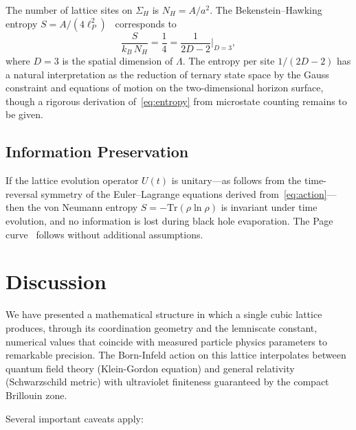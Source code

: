 \documentclass[12pt,a4paper]{article}
\begin{document}
The number of lattice sites on $\Sigma_{H}$ is $N_{H} = A/a^{2}$. The Bekenstein--Hawking entropy $S = A/(4\ell_{P}^{2})$~\cite{Bekenstein} corresponds to
\begin{equation}\label{eq:entropy}
\frac{S}{k_{B}\,N_{H}} = \frac{1}{4} = \frac{1}{2D - 2}\bigg|_{D=3},
\end{equation}
where $D = 3$ is the spatial dimension of $\Lambda$. The entropy per site $1/(2D-2)$ has a natural interpretation as the reduction of ternary state space by the Gauss constraint and equations of motion on the two-dimensional horizon surface, though a rigorous derivation of~\eqref{eq:entropy} from microstate counting remains to be given.

\subsection{Information Preservation}

If the lattice evolution operator $U(t)$ is unitary---as follows from the time-reversal symmetry of the Euler--Lagrange equations derived from~\eqref{eq:action}---then the von Neumann entropy $S = -\mathrm{Tr}(\rho\ln\rho)$ is invariant under time evolution, and no information is lost during black hole evaporation. The Page curve~\cite{Page} follows without additional assumptions.

\section{Discussion}

We have presented a mathematical structure in which a single cubic lattice produces, through its coordination geometry and the lemniscate constant, numerical values that coincide with measured particle physics parameters to remarkable precision. The Born-Infeld action on this lattice interpolates between quantum field theory (Klein-Gordon equation) and general relativity (Schwarzschild metric) with ultraviolet finiteness guaranteed by the compact Brillouin zone.

Several important caveats apply:
\end{document}
